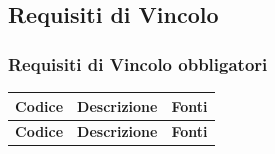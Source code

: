 \subsection{Requisiti di Vincolo}
\subsubsection{Requisiti di Vincolo obbligatori}
\begin{longtable}{|>{\raggedright}p{}|>{\raggedright\arraybackslash}p{}|>{\raggedright\arraybackslash}p{}|}
    \hline
    \rowcolor[gray]{0.9}
    \textbf{Codice} & \textbf{Descrizione} & \textbf{Fonti} \\
    \hline
    \endfirsthead
    
    \hline
    \rowcolor[gray]{0.9}
    \textbf{Codice} & \textbf{Descrizione} & \textbf{Fonti} \\
    \hline
    \endhead
    

\end{longtable}
